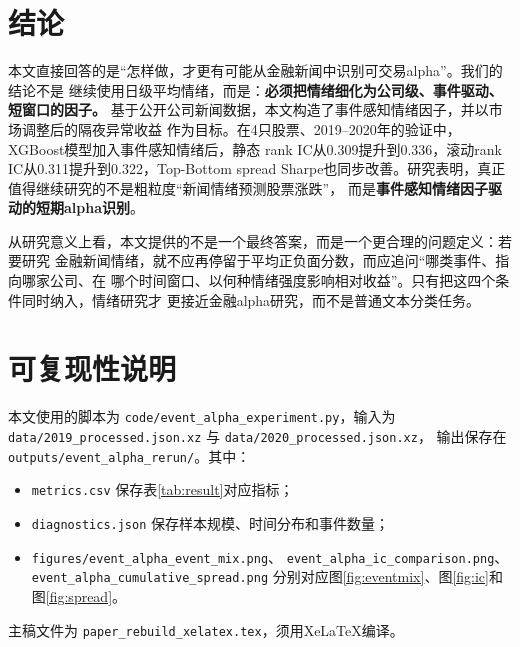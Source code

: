 \documentclass[UTF8,a4paper,10pt,twocolumn,fontset=none]{ctexart}
\begin{document}
\section{结论}

本文直接回答的是“怎样做，才更有可能从金融新闻中识别可交易alpha”。我们的结论不是
继续使用日级平均情绪，而是：\textbf{必须把情绪细化为公司级、事件驱动、短窗口的因子。}
基于公开公司新闻数据，本文构造了事件感知情绪因子，并以市场调整后的隔夜异常收益
作为目标。在4只股票、2019--2020年的验证中，XGBoost模型加入事件感知情绪后，静态
rank IC从0.309提升到0.336，滚动rank IC从0.311提升到0.322，Top-Bottom spread
Sharpe也同步改善。研究表明，真正值得继续研究的不是粗粒度“新闻情绪预测股票涨跌”，
而是\textbf{事件感知情绪因子驱动的短期alpha识别}。

从研究意义上看，本文提供的不是一个最终答案，而是一个更合理的问题定义：若要研究
金融新闻情绪，就不应再停留于平均正负面分数，而应追问“哪类事件、指向哪家公司、在
哪个时间窗口、以何种情绪强度影响相对收益”。只有把这四个条件同时纳入，情绪研究才
更接近金融alpha研究，而不是普通文本分类任务。

\section{可复现性说明}

本文使用的脚本为 \texttt{code/event\_alpha\_experiment.py}，输入为
\texttt{data/2019\_processed.json.xz} 与 \texttt{data/2020\_processed.json.xz}，
输出保存在 \texttt{outputs/event\_alpha\_rerun/}。其中：
\begin{itemize}[leftmargin=1.4em]
  \item \texttt{metrics.csv} 保存表\ref{tab:result}对应指标；
  \item \texttt{diagnostics.json} 保存样本规模、时间分布和事件数量；
  \item \texttt{figures/event\_alpha\_event\_mix.png}、
  \texttt{event\_alpha\_ic\_comparison.png}、
  \texttt{event\_alpha\_cumulative\_spread.png}
  分别对应图\ref{fig:eventmix}、图\ref{fig:ic}和图\ref{fig:spread}。
\end{itemize}
主稿文件为 \texttt{paper\_rebuild\_xelatex.tex}，须用XeLaTeX编译。
\end{document}
